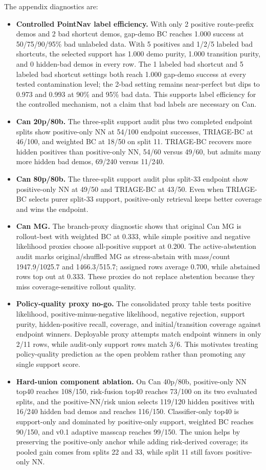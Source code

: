 \documentclass{article}
\newcommand{\method}{TRIAGE-BC}
\begin{document}
The appendix diagnostics are:
\begin{itemize}[leftmargin=*]
  \item \textbf{Controlled PointNav label efficiency.} With only 2 positive route-prefix demos and 2 bad shortcut demos, gap-demo BC reaches 1.000 success at 50/75/90/95\% bad unlabeled data. With 5 positives and 1/2/5 labeled bad shortcuts, the selected support has 1.000 demo purity, 1.000 transition purity, and 0 hidden-bad demos in every row. The 1 labeled bad shortcut and 5 labeled bad shortcut settings both reach 1.000 gap-demo success at every tested contamination level; the 2-bad setting remains near-perfect but dips to 0.973 and 0.993 at 90\% and 95\% bad data. This supports label efficiency for the controlled mechanism, not a claim that bad labels are necessary on Can.
  \item \textbf{Can 20p/80b.} The three-split support audit plus two completed endpoint splits show positive-only NN at 54/100 endpoint successes, \method{} at 46/100, and weighted BC at 18/50 on split 11. \method{} recovers more hidden positives than positive-only NN, 54/60 versus 49/60, but admits many more hidden bad demos, 69/240 versus 11/240.
  \item \textbf{Can 80p/80b.} The three-split support audit plus split-33 endpoint show positive-only NN at 49/50 and \method{} at 43/50. Even when \method{} selects purer split-33 support, positive-only retrieval keeps better coverage and wins the endpoint.
  \item \textbf{Can MG.} The branch-proxy diagnostic shows that original Can MG is rollout-best with weighted BC at 0.333, while simple positive and negative likelihood proxies choose all-positive support at 0.200. The active-abstention audit marks original/shuffled MG as stress-abstain with mass/count 1947.9/1025.7 and 1466.3/515.7; assigned rows average 0.700, while abstained rows top out at 0.333. These proxies do not replace abstention because they miss coverage-sensitive rollout quality.
  \item \textbf{Policy-quality proxy no-go.} The consolidated proxy table tests positive likelihood, positive-minus-negative likelihood, negative rejection, support purity, hidden-positive recall, coverage, and initial/transition coverage against endpoint winners. Deployable proxy attempts match endpoint winners in only 2/11 rows, while audit-only support rows match 3/6. This motivates treating policy-quality prediction as the open problem rather than promoting any single support score.
  \item \textbf{Hard-union component ablation.} On Can 40p/80b, positive-only NN top40 reaches 108/150, risk-fusion top40 reaches 73/100 on its two evaluated splits, and the positive-NN/risk union selects 119/120 hidden positives with 16/240 hidden bad demos and reaches 116/150. Classifier-only top40 is support-only and dominated by positive-only support, weighted BC reaches 90/150, and v0.1 adaptive masscap reaches 99/150. The union helps by preserving the positive-only anchor while adding risk-derived coverage; its pooled gain comes from splits 22 and 33, while split 11 still favors positive-only NN.

\end{itemize}
\end{document}
